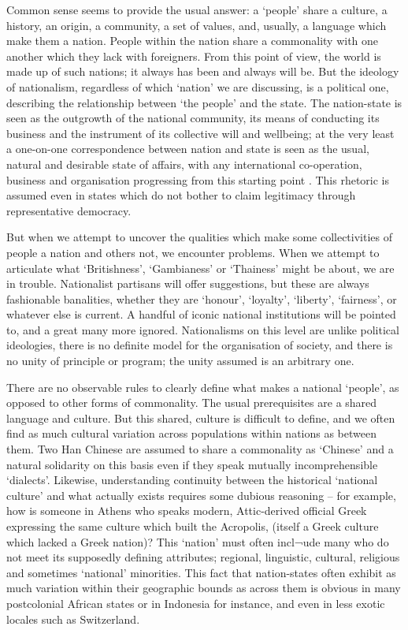 Common sense seems to provide the usual answer: a ‘people’ share a culture, a history, an origin, a community, a set of values, and, usually, a language which make them a nation.
People within the nation share a commonality with one another which they lack with foreigners.
From this point of view, the world is made up of such nations; it always has been and always will be.
But the ideology of nationalism, regardless of which ‘nation’ we are discussing, is a political one, describing the relationship between ‘the people’ and the state.
The nation-state is seen as the outgrowth of the national community, its means of conducting its business and the instrument of its collective will and wellbeing; at the very least a one-on-one correspondence between nation and state is seen as the usual, natural and desirable state of affairs, with any international co-operation, business and organisation progressing from this starting point .
This rhetoric is assumed even in states which do not bother to claim legitimacy through representative democracy.

But when we attempt to uncover the qualities which make some collectivities of people a nation and others not, we encounter problems.
When we attempt to articulate what ‘Britishness’, ‘Gambianess’ or ‘Thainess’ might be about, we are in trouble.
Nationalist partisans will offer suggestions, but these are always fashionable banalities, whether they are ‘honour’, ‘loyalty’, ‘liberty’, ‘fairness’, or whatever else is current.
A handful of iconic national institutions will be pointed to, and a great many more ignored.
Nationalisms on this level are unlike political ideologies, there is no definite model for the organisation of society, and there is no unity of principle or program; the unity assumed is an arbitrary one.

There are no observable rules to clearly define what makes a national ‘people’, as opposed to other forms of commonality.
The usual prerequisites are a shared language and culture.
But this shared, culture is difficult to define, and we often find as much cultural variation across populations within nations as between them.
Two Han Chinese are assumed to share a commonality as ‘Chinese’ and a natural solidarity on this basis even if they speak mutually incomprehensible ‘dialects’.
Likewise, understanding continuity between the historical ‘national culture’ and what actually exists requires some dubious reasoning – for example, how is someone in Athens who speaks modern, Attic-derived official Greek expressing the same culture which built the Acropolis, (itself a Greek culture which lacked a Greek nation)? This ‘nation’ must often incl¬ude many who do not meet its supposedly defining attributes; regional, linguistic, cultural, religious and sometimes ‘national’ minorities.
This fact that nation-states often exhibit as much variation within their geographic bounds as across them is obvious in many postcolonial African states or in Indonesia for instance, and even in less exotic locales such as Switzerland.

